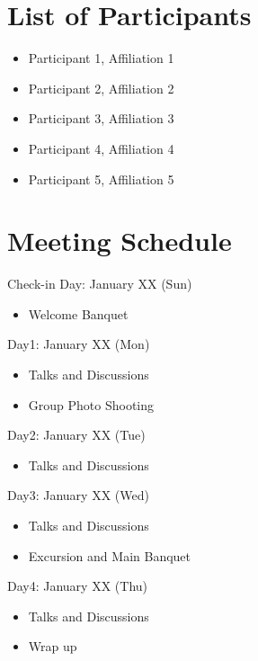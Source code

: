 \documentclass[a4paper]{article}
\begin{document}
\section*{List of Participants}
\begin{itemize}
\item Participant 1, Affiliation 1
\item Participant 2, Affiliation 2
\item Participant 3, Affiliation 3
\item Participant 4, Affiliation 4
\item Participant 5, Affiliation 5
\end{itemize}

\clearpage

\section*{Meeting Schedule}
\begin{bfseries}
Check-in Day: January XX (Sun)
\end{bfseries}
\begin{itemize}
\item Welcome Banquet
\end{itemize}
\begin{bfseries}
{Day1: January XX (Mon)}
\end{bfseries}
\begin{itemize}
\item Talks and Discussions
\item Group Photo Shooting
\end{itemize}
\begin{bfseries}
Day2: January XX (Tue)
\end{bfseries}
\begin{itemize}
\item Talks and Discussions
\end{itemize}
\begin{bfseries}
Day3: January XX (Wed)
\end{bfseries}
\begin{itemize}
\item Talks and Discussions
\item Excursion and Main Banquet
\end{itemize}
\begin{bfseries}
Day4: January XX (Thu)
\end{bfseries}
\begin{itemize}
\item Talks and Discussions
\item Wrap up
\end{itemize}
\end{document}
